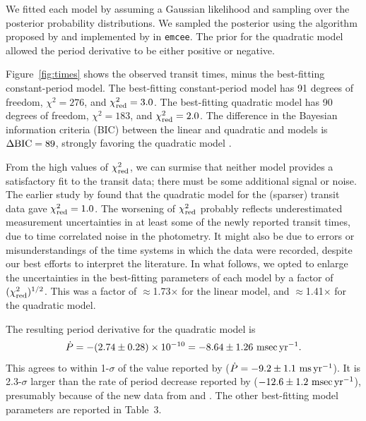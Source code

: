 \documentclass[12pt,twocolumn,tighten,trackchanges]{aastex62}
\begin{document}
We fitted each model by assuming a Gaussian likelihood and sampling
over the posterior probability distributions.  We sampled the
posterior using the algorithm proposed by
\citet{goodman_ensemble_2010} and implemented by
\citet{foreman-mackey_emcee_2013} in \texttt{emcee}.  The prior for
the quadratic model allowed the period derivative to be either
positive or negative.

Figure~\ref{fig:times} shows the observed transit times, minus the
best-fitting constant-period model.  The best-fitting constant-period
model has 91 degrees of freedom, $\chi^2 = 276$, and $\chi^2_{\rm
red}=3.0$.  The best-fitting quadratic model has 90 degrees of
freedom, $\chi^2 = 183$, and $\chi^2_{\rm red}=2.0$.  The difference
in the Bayesian information criteria (BIC) between the linear and
quadratic and models is $\Delta {\rm BIC} = 89$, strongly favoring the
quadratic model \citep{kass_bayes_1995}.

From the high values of $\chi^2_{\rm red}$, we can surmise that
neither model provides a satisfactory fit to the transit data; there
must be some additional signal or noise.  The earlier study by
 found that the quadratic model for the
(sparser) transit data gave $\chi^2_{\rm red}=1.0$.  The worsening of
$\chi^2_{\rm red}$ probably reflects underestimated measurement
uncertainties in at least some of the newly reported transit times,
due to time correlated noise in the photometry. It might also be due
to errors or misunderstandings of the time systems in which the data
were recorded, despite our best efforts to interpret the literature.
In what follows, we opted to enlarge the uncertainties in the
best-fitting parameters of each model by a factor of $(\chi^2_{\rm
red})^{1/2}$.  This was a factor of $\approx$1.73$\times$ for the
linear model, and $\approx$1.41$\times$ for the quadratic model.

The resulting period derivative for the quadratic model is 
\begin{equation}
\dot{P}
  = - (2.74 \pm 0.28)\times 10^{-10}
  = - 8.64 \pm 1.26~{\rm msec}\,{\rm yr}^{-1}.
  \label{eq:dP_dt_obs}
\end{equation}
This agrees to within 1-$\sigma$ of the value reported by
\citet{southworth_transit_2019} ($\dot{P} = - 9.2 \pm 1.1~{\rm
ms}\,{\rm yr}^{-1}$).  It is 2.3-$\sigma$ larger than the rate of
period decrease reported by 
($- 12.6 \pm 1.2~{\rm msec}\,{\rm yr}^{-1}$), presumably because of the new
data from \citeauthor{southworth_transit_2019} and
\citeauthor{baluev_2019}. The other best-fitting model parameters are
reported in Table~3.
\end{document}
